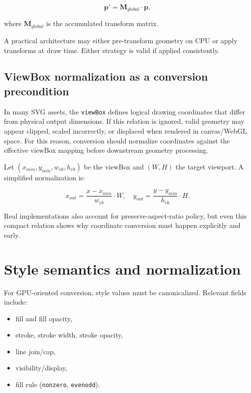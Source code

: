 \begin{equation}
\mathbf{p'} = \mathbf{M}_{global} \cdot \mathbf{p},
\label{eq:svg_affine_mapping}
\end{equation}

where $\mathbf{M}_{global}$ is the accumulated transform matrix.

A practical architecture may either pre-transform geometry on CPU or apply transforms at draw time.
Either strategy is valid if applied consistently.

\subsection{ViewBox normalization as a conversion precondition}

In many SVG assets, the \texttt{viewBox} defines logical drawing coordinates that differ from physical output dimensions.
If this relation is ignored, valid geometry may appear clipped, scaled incorrectly, or displaced when rendered in canvas/WebGL space.
For this reason, conversion should normalize coordinates against the effective viewBox mapping before downstream geometry processing.

Let $(x_{min}, y_{min}, w_{vb}, h_{vb})$ be the viewBox and $(W, H)$ the target viewport.
A simplified normalization is:

\begin{equation}
x_{out} = \frac{x - x_{min}}{w_{vb}} \cdot W,\quad
y_{out} = \frac{y - y_{min}}{h_{vb}} \cdot H.
\label{eq:viewbox_normalization}
\end{equation}

Real implementations also account for preserve-aspect-ratio policy, but even this compact relation shows why coordinate conversion must happen explicitly and early.

\section{Style semantics and normalization}

For GPU-oriented conversion, style values must be canonicalized.
Relevant fields include:

\begin{itemize}
\item fill and fill opacity,
\item stroke, stroke width, stroke opacity,
\item line join/cap,
\item visibility/display,
\item fill rule (\texttt{nonzero}, \texttt{evenodd}).
\end{itemize}

